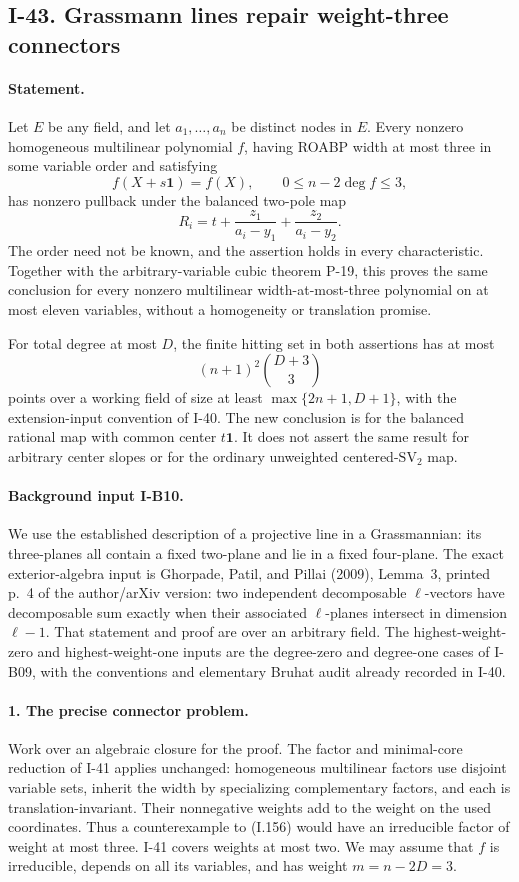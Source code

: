 \subsection{I-43. Grassmann lines repair weight-three connectors}
\label{I-43}

\paragraph{Statement.}
Let $E$ be any field, and let $a_1,\ldots,a_n$ be distinct
nodes in $E$. Every nonzero homogeneous multilinear polynomial
$f$, having ROABP width at most three in some variable order
and satisfying
\[
 f(X+s\mathbf1)=f(X),\qquad 0\le n-2\deg f\le3,
 \tag{I.156}
\]
has nonzero pullback under the balanced two-pole map
\[
 R_i=t+\frac{z_1}{a_i-y_1}+\frac{z_2}{a_i-y_2}.
 \tag{I.157}
\]
The order need not be known, and the assertion holds in every
characteristic. Together with the arbitrary-variable cubic
theorem P-19, this proves the same conclusion for every
nonzero multilinear width-at-most-three polynomial on at most
eleven variables, without a homogeneity or translation promise.

For total degree at most $D$, the finite hitting set in both
assertions has at most
\[
 (n+1)^2\binom{D+3}{3}
 \tag{I.158}
\]
points over a working field of size at least
$\max\{2n+1,D+1\}$, with the extension-input convention of
I-40. The new conclusion is for the balanced rational map
with common center $t\mathbf1$. It does not assert the same
result for arbitrary center slopes or for the ordinary
unweighted centered-$\mathrm{SV}_2$ map.

\paragraph{Background input I-B10.}
We use the established description of a projective line in a
Grassmannian: its three-planes all contain a fixed two-plane
and lie in a fixed four-plane. The exact exterior-algebra
input is Ghorpade, Patil, and Pillai (2009), Lemma~3, printed
p.~4 of the author/arXiv version: two independent decomposable
$\ell$-vectors have decomposable sum exactly when their
associated $\ell$-planes intersect in dimension $\ell-1$.
That statement and proof are over an arbitrary field. The
highest-weight-zero and highest-weight-one inputs are the
degree-zero and degree-one cases of I-B09, with the conventions
and elementary Bruhat audit already recorded in I-40.

\paragraph{1. The precise connector problem.}
Work over an algebraic closure for the proof. The factor and
minimal-core reduction of I-41 applies unchanged: homogeneous
multilinear factors use disjoint variable sets, inherit the
width by specializing complementary factors, and each is
translation-invariant. Their nonnegative weights add to the
weight on the used coordinates. Thus a counterexample to
(I.156) would have an irreducible factor of weight at most
three. I-41 covers weights at most two. We may assume that
$f$ is irreducible, depends on all its variables, and has
weight $m=n-2D=3$.

